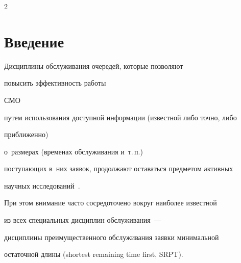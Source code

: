 

 


\vspace*{2pt}













\thispagestyle{headings}





\begin{multicols}{2}





\label{st\stat}








\section{Введение}





\vspace*{-5pt}





Дисциплины обслуживания очередей, которые позволяют


повысить эффективность работы %


СМО


путем использования доступной информации (известной либо точно, либо 


приближенно)


о~размерах (временах обслуживания и~т.\,п.)\


поступающих в~них заявок, продолжают оставаться предметом активных


научных исследований~\cite{i2, i3, i4, i5, i6}.


При этом внимание часто сосредоточено вокруг наиболее известной


из всех специальных дисциплин обслуживания~---


дисциплины преимущественного обслуживания заявки минимальной


остаточной длины (shortest remaining time first, SRPT).






\end{multicols}
